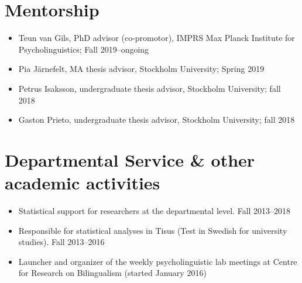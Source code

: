 \documentclass[margin, 11pt]{res} %
\begin{document}
\begin{resume}
\begin{itemize}
\end{itemize}


\section{\sc Mentorship}

\begin{itemize}

\item Teun van Gils, PhD advisor (co-promotor), IMPRS Max Planck Institute for Psycholinguistics; Fall 2019--ongoing

\item Pia Järnefelt, MA thesis advisor, Stockholm University; Spring 2019

\item Petrus Isaksson, undergraduate thesis advisor, Stockholm University; fall 2018

\item Gaston Prieto, undergraduate thesis advisor, Stockholm University; fall 2018

\end{itemize}



\section{\sc Departmental Service \& other academic activities}

\begin{itemize}

\item Statistical support for researchers at the departmental level. 
Fall 2013--2018

\item Responsible for statistical analyses in Tisus (Test in Swedish for university studies). 
Fall 2013--2016


\item Launcher and organizer of the weekly psycholinguistic lab meetings at Centre for Research on Bilingualism (started January 2016)


\end{itemize}
\end{resume}
\end{document}
